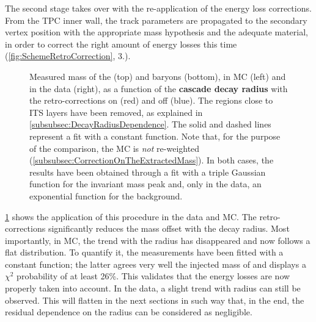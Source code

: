 The second stage takes over with the re-application of the energy loss corrections. From the TPC inner wall, the track parameters are propagated to the secondary vertex position with the appropriate mass hypothesis and the adequate material, in order to correct the right amount of energy losses this time (\fig\ref{fig:SchemeRetroCorrection}, 3.).\\

\begin{figure}[p]
\hspace*{-2.cm}
\hspace*{-2.cm}
\caption{Measured mass of the \rmXi (top) and \rmOmega baryons (bottom), in MC (left) and in the data (right), as a function of the \textbf{cascade decay radius} with the retro-corrections on (red) and off (blue). The regions close to ITS layers have been removed, as explained in \Sec\ref{subsubsec:DecayRadiusDependence}. The solid and dashed lines represent a fit with a constant function. Note that, for the purpose of the comparison, the MC is \textit{not} re-weighted (\Sec\ref{subsubsec:CorrectionOnTheExtractedMass}). In both cases, the results have been obtained through a fit with a triple Gaussian function for the invariant mass peak and, only in the data, an exponential function for the background.}
	\label{fig:MassVsRadiusAfterRetrocorrection}
\end{figure}

\Fig\ref{fig:MassVsRadiusAfterRetrocorrection} shows the application of this procedure in the data and MC. The retro-corrections significantly reduces the mass offset with the decay radius. Most importantly, in MC, the trend with the radius has disappeared and now follows a flat distribution. To quantify it, the measurements have been fitted with a constant function; the latter agrees very well the injected mass of \rmXi and displays a $\chi^{2}$ probability of at least 26\%. This validates that the energy losses are now properly taken into account. In the data, a slight trend with radius can still be observed. This will flatten in the next sections in such way that, in the end, the residual dependence on the radius can be considered as negligible. 


